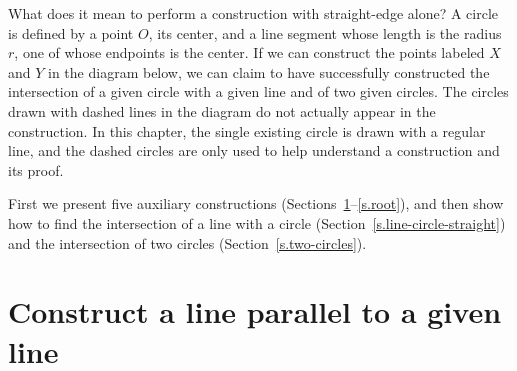 What does it mean to perform a construction with straight-edge alone? A circle is defined by a point $O$, its center, and a line segment whose length is the radius $r$, one of whose endpoints is the center. If we can construct the points labeled $X$ and $Y$ in the diagram below, we can claim to have successfully constructed the intersection of a given circle with a given line and of two given circles. The circles drawn with dashed lines in the diagram do not actually appear in the construction. In this chapter, the single existing circle is drawn with a regular line, and the dashed circles are only used to help understand a construction and its proof.
\begin{center}
\end{center}

First we present five auxiliary constructions (Sections~\ref{s.parallel}--\ref{s.root}), and then show how to find the intersection of a line with a circle (Section~\ref{s.line-circle-straight}) and the intersection of two circles (Section~\ref{s.two-circles}).

\newpage

\section{Construct a line parallel to a given line}\label{s.parallel}

